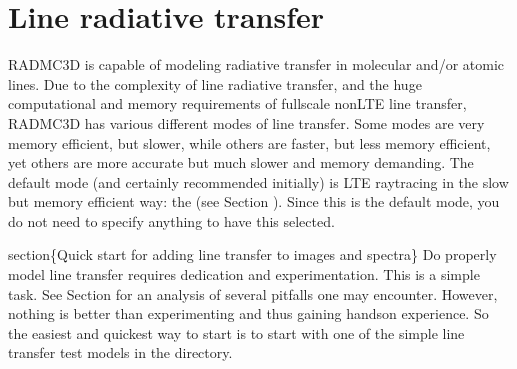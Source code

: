 \documentclass[letterpaper,10pt,english]{sphinxmanual}
\begin{document}
\chapter{Line radiative transfer}
\label{\detokenize{lineradtrans:line-radiative-transfer}}\label{\detokenize{lineradtrans:chap-line-transfer}}\label{\detokenize{lineradtrans::doc}}
RADMC\sphinxhyphen{}3D is capable of modeling radiative transfer in molecular and/or
atomic lines. Due to the complexity of line radiative transfer, and the huge
computational and memory requirements of full\sphinxhyphen{}scale non\sphinxhyphen{}LTE line transfer,
RADMC\sphinxhyphen{}3D has various different modes of line transfer. Some modes are very
memory efficient, but slower, while others are faster, but less memory
efficient, yet others are more accurate but much slower and memory
demanding. The default mode (and certainly recommended initially) is LTE
ray\sphinxhyphen{}tracing in the slow but memory efficient way: the 
(see Section {\hyperref[\detokenize{lineradtrans:sec-line-trans-modes}]{}}). Since this is the default mode,
you do not need to specify anything to have this selected.

section\{Quick start for adding line transfer to images and spectra\}
Do properly model line transfer requires dedication and experimentation.
This is  a simple task. See Section {\hyperref[\detokenize{lineradtrans:sec-lines-pitfalls}]{}} for an
analysis of several pitfalls one may encounter. However, nothing is better
than experimenting and thus gaining hands\sphinxhyphen{}on experience. So the easiest and
quickest way to start is to start with one of the simple line transfer test
models in the  directory.
\end{document}
